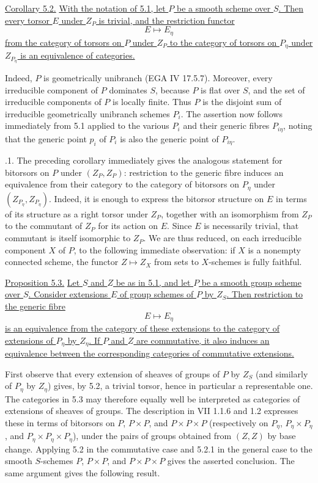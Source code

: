 \medskip
\noindent\underline{Corollary 5.2.}  \underline{With the notation of
5.1, let $P$ be a smooth scheme over $S$.  Then every torsor $E$ under
$Z_P$ is trivial, and the restriction functor}
\[
 E\longmapsto E_\eta
\]
\underline{from the category of torsors on $P$ under $Z_P$ to the
category of torsors on $P_\eta$ under $Z_{P_\eta}$ is an equivalence of
categories.}

Indeed, $P$ is geometrically unibranch (EGA IV 17.5.7).  Moreover,
every irreducible component of $P$ dominates $S$, because $P$ is flat
over $S$, and the set of irreducible components of $P$ is locally
finite.  Thus $P$ is the disjoint sum of irreducible geometrically
unibranch schemes $P_i$.  The assertion now follows immediately from
5.1 applied to the various $P_i$ and their generic fibres $P_{i\eta}$,
noting that the generic point $p_i$ of $P_i$ is also the generic point
of $P_{i\eta}$.

\medskip
{}.1.  The preceding corollary immediately gives the
analogous statement for bitorsors on $P$ under $(Z_P,Z_P)$: restriction
to the generic fibre induces an equivalence from their category to the
category of bitorsors on $P_\eta$ under
$(Z_{P_\eta},Z_{P_\eta})$.  Indeed, it is enough to express the bitorsor
structure on $E$ in terms of its structure as a right torsor under
$Z_P$, together with an isomorphism from $Z_P$ to the commutant of
$Z_P$ for its action on $E$.  Since $E$ is necessarily trivial, that
commutant is itself isomorphic to $Z_P$.  We are thus reduced, on each
irreducible component $X$ of $P$, to the following immediate
observation: if $X$ is a nonempty connected scheme, the functor
$Z\mapsto Z_X$ from sets to $X$-schemes is fully faithful.

\medskip
\noindent\underline{Proposition 5.3.}  \underline{Let $S$ and $Z$ be
as in 5.1, and let $P$ be a smooth group scheme over $S$.  Consider
extensions $E$ of group schemes of $P$ by $Z_S$.  Then restriction to
the generic fibre}
\[
 E\longmapsto E_\eta
\]
\underline{is an equivalence from the category of these extensions to
the category of extensions of $P_\eta$ by $Z_\eta$.  If $P$ and $Z$
are commutative, it also induces an equivalence between the
corresponding categories of commutative extensions.}

First observe that every extension of sheaves of groups of $P$ by
$Z_S$ (and similarly of $P_\eta$ by $Z_\eta$) gives, by 5.2, a trivial
torsor, hence in particular a representable one.  The categories in
5.3 may therefore equally well be interpreted as categories of
extensions of sheaves of groups.  The description in VII 1.1.6 and
1.2 expresses these in terms of bitorsors on
$P$, $P\times P$, and $P\times P\times P$ (respectively on
$P_\eta$, $P_\eta\times P_\eta$, and
$P_\eta\times P_\eta\times P_\eta$), under the pairs of groups
obtained from $(Z,Z)$ by base change.  Applying 5.2 in the commutative
case and 5.2.1 in the general case to the smooth $S$-schemes
$P$, $P\times P$, and $P\times P\times P$ gives the asserted
conclusion.  The same argument gives the following result.

